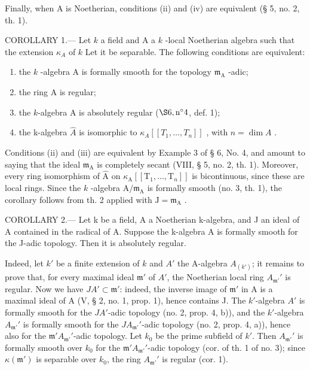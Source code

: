 Finally, when A is Noetherian, conditions (ii) and (iv) are equivalent (§ 5, no. 2, th. 1).

COROLLARY 1.--- Let \(k\) a field and A a \(k\) -local Noetherian algebra such that the extension \(\kappa_{A}\) of \(k\) Let it be separable. The following conditions are equivalent:

\begin{enumerate}
\def\labelenumi{(\roman{enumi})}
\item
  the \(k\) -algebra A is formally smooth for the topology \(\mathfrak{m}_{\mathrm{A}}\) -adic;
\item
  the ring A is regular;
\item
  the \(k\)-algebra A is absolutely regular (\(\S 6, \mathrm{n}^{\circ} 4\), def. 1);
\item
  the k-algebra \(\hat{A}\) is isomorphic to \(\kappa_{A}[[T_{1},\ldots,T_{n}]]\) , with \(n=\dim A\) .
\end{enumerate}

Conditions (ii) and (iii) are equivalent by Example 3 of § 6, No. 4, and amount to saying that the ideal \(\mathfrak{m}_{\mathrm{A}}\) is completely secant (VIII, § 5, no. 2, th. 1). Moreover, every ring isomorphism of \(\widehat{\mathrm{A}}\) on \(\kappa_{\mathrm{A}}[[\mathrm{T}_{1},\ldots,\mathrm{T}_{n}]]\) is bicontinuous, since these are local rings. Since the \(k\) -algebra \(\mathrm{A}/\mathfrak{m}_{\mathrm{A}}\) is formally smooth (no. 3, th. 1), the corollary follows from th. 2 applied with \(\mathrm{J}=\mathfrak{m}_{\mathrm{A}}\) .

COROLLARY 2.--- Let k be a field, A a Noetherian k-algebra, and J an ideal of A contained in the radical of A. Suppose the k-algebra A is formally smooth for the J-adic topology. Then it is absolutely regular.

Indeed, let \(k'\) be a finite extension of \(k\) and \(A'\) the A-algebra \(A_{(k')}\); it remains to prove that, for every maximal ideal \(\mathfrak{m}'\) of \(A'\), the Noetherian local ring \(A_{\mathfrak{m}'}'\) is regular. Now we have \(JA' \subset \mathfrak{m}'\): indeed, the inverse image of \(\mathfrak{m}'\) in A is a maximal ideal of A (V, § 2, no. 1, prop. 1), hence contains J. The \(k'\)-algebra \(A'\) is formally smooth for the \(JA'\)-adic topology (no. 2, prop. 4, b)), and the \(k'\)-algebra \(A_{\mathfrak{m}'}'\) is formally smooth for the \(JA_{\mathfrak{m}'}'\)-adic topology (no. 2, prop. 4, a)), hence also for the \(\mathfrak{m}'A_{\mathfrak{m}'}'\)-adic topology. Let \(k_0\) be the prime subfield of \(k'\). Then \(A_{\mathfrak{m}'}'\) is formally smooth over \(k_0\) for the \(\mathfrak{m}'A_{\mathfrak{m}'}'\)-adic topology (cor. of th. 1 of no. 3); since \(\kappa(\mathfrak{m}')\) is separable over \(k_0\), the ring \(A_{\mathfrak{m}'}'\) is regular (cor. 1).

